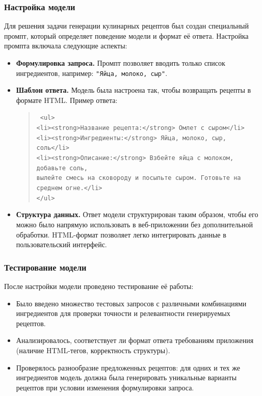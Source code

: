 {{\subsubsection*{Настройка модели}
Для решения задачи генерации кулинарных рецептов был создан специальный промпт, который определяет поведение модели и формат её ответа. Настройка промпта включала следующие аспекты:
\begin{itemize}
    \item \textbf{Формулировка запроса.} Промпт позволяет вводить только список ингредиентов, например: \texttt{"Яйца, молоко, сыр"}.
    \item \textbf{Шаблон ответа.} Модель была настроена так, чтобы возвращать рецепты в формате HTML. Пример ответа:
    \begin{quote}
        \texttt{
        <ul> \\
            <li><strong>Название рецепта:</strong> Омлет с сыром</li> \\
            <li><strong>Ингредиенты:</strong> Яйца, молоко, сыр, соль</li> \\
            <li><strong>Описание:</strong> Взбейте яйца с молоком, добавьте соль, \\
                вылейте смесь на сковороду и посыпьте сыром. Готовьте на среднем огне.</li> \\
        </ul>
        }
        \end{quote}
    \item \textbf{Структура данных.} Ответ модели структурирован таким образом, чтобы его можно было напрямую использовать в веб-приложении без дополнительной обработки. HTML-формат позволяет легко интегрировать данные в пользовательский интерфейс.
\end{itemize}

\subsubsection*{Тестирование модели}
После настройки модели проведено тестирование её работы:
\begin{itemize}
    \item Было введено множество тестовых запросов с различными комбинациями ингредиентов для проверки точности и релевантности генерируемых рецептов.
    \item Анализировалось, соответствует ли формат ответа требованиям приложения (наличие HTML-тегов, корректность структуры).
    \item Проверялось разнообразие предложенных рецептов: для одних и тех же ингредиентов модель должна была генерировать уникальные варианты рецептов при условии изменения формулировки запроса.
\end{itemize}

}}
